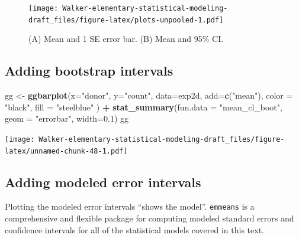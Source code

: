 \documentclass[]{book}
\newenvironment{Shaded}{\begin{snugshade}}{\end{snugshade}}
\newcommand{\KeywordTok}[1]{\textcolor[rgb]{0.13,0.29,0.53}{\textbf{#1}}}
\newcommand{\DataTypeTok}[1]{\textcolor[rgb]{0.13,0.29,0.53}{#1}}
\newcommand{\FloatTok}[1]{\textcolor[rgb]{0.00,0.00,0.81}{#1}}
\newcommand{\StringTok}[1]{\textcolor[rgb]{0.31,0.60,0.02}{#1}}
\newcommand{\OperatorTok}[1]{\textcolor[rgb]{0.81,0.36,0.00}{\textbf{#1}}}
\newcommand{\NormalTok}[1]{#1}
\begin{document}
\begin{figure}
\centering
\texttt{[image: Walker-elementary-statistical-modeling-draft\_files/figure-latex/plots-unpooled-1.pdf]}
\caption{\label{fig:plots-unpooled}(A) Mean and 1 SE error bar. (B) Mean and
95\% CI.}
\end{figure}

\subsection{Adding bootstrap
intervals}\label{adding-bootstrap-intervals}

\begin{Shaded}
\begin{Highlighting}[]
\NormalTok{gg <-}\StringTok{ }\KeywordTok{ggbarplot}\NormalTok{(}\DataTypeTok{x=}\StringTok{"donor"}\NormalTok{, }
                \DataTypeTok{y=}\StringTok{"count"}\NormalTok{, }
                \DataTypeTok{data=}\NormalTok{exp2d,}
                \DataTypeTok{add=}\KeywordTok{c}\NormalTok{(}\StringTok{"mean"}\NormalTok{),}
                \DataTypeTok{color =} \StringTok{"black"}\NormalTok{,}
                \DataTypeTok{fill =} \StringTok{"steelblue"}
\NormalTok{) }\OperatorTok{+}\StringTok{ }
\StringTok{  }\KeywordTok{stat_summary}\NormalTok{(}\DataTypeTok{fun.data =} \StringTok{"mean_cl_boot"}\NormalTok{, }\DataTypeTok{geom =} \StringTok{"errorbar"}\NormalTok{, }\DataTypeTok{width=}\FloatTok{0.1}\NormalTok{)}
\NormalTok{gg}
\end{Highlighting}
\end{Shaded}

\texttt{[image: Walker-elementary-statistical-modeling-draft\_files/figure-latex/unnamed-chunk-48-1.pdf]}

\subsection{Adding modeled error
intervals}\label{adding-modeled-error-intervals}

Plotting the modeled error intervals ``shows the model''.
\texttt{emmeans} is a comprehensive and flexible package for computing
modeled standard errors and confidence intervals for all of the
statistical models covered in this text.
\end{document}
